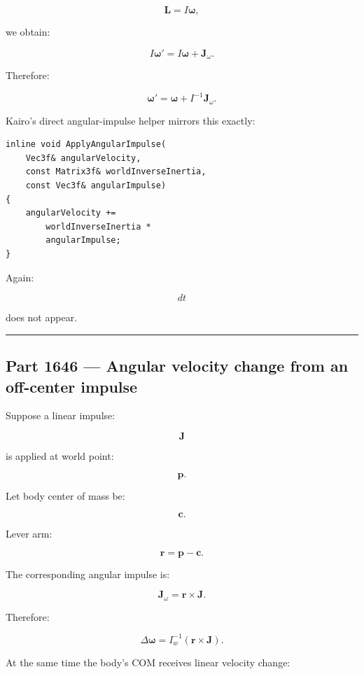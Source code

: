 \[
\mathbf L=I\boldsymbol\omega,
\]

we obtain:

\[
I\boldsymbol\omega'
=
I\boldsymbol\omega+
\mathbf J_\omega.
\]

Therefore:

\[
\boxed{
\boldsymbol\omega'
=
\boldsymbol\omega+
I^{-1}\mathbf J_\omega.
}
\]

Kairo's direct angular-impulse helper mirrors this exactly:

\begin{verbatim}
inline void ApplyAngularImpulse(
    Vec3f& angularVelocity,
    const Matrix3f& worldInverseInertia,
    const Vec3f& angularImpulse)
{
    angularVelocity +=
        worldInverseInertia *
        angularImpulse;
}
\end{verbatim}

Again:

\[
dt
\]

does not appear.

\begin{center}\rule{0.5\linewidth}{0.5pt}\end{center}

\subsection{Part 1646 --- Angular velocity change from an off-center impulse}\label{06-engine-ii-ch036-part-1646-angular-velocity-change-from-an-off-center-impulse}

\hypertarget{06-engine-ii-ch036-part-1646-angular-velocity-change-from-an-off-center-impulse}{}

Suppose a linear impulse:

\[
\mathbf J
\]

is applied at world point:

\[
\mathbf p.
\]

Let body center of mass be:

\[
\mathbf c.
\]

Lever arm:

\[
\mathbf r
=
\mathbf p-\mathbf c.
\]

The corresponding angular impulse is:

\[
\boxed{
\mathbf J_\omega
=
\mathbf r\times\mathbf J.
}
\]

Therefore:

\[
\boxed{
\Delta\boldsymbol\omega
=
I_w^{-1}
(
\mathbf r\times\mathbf J
).
}
\]

At the same time the body's COM receives linear velocity change:

